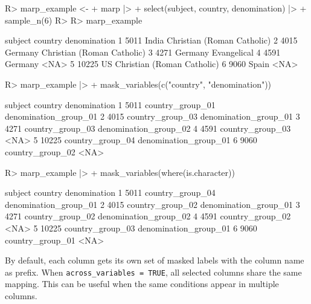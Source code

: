 \documentclass[
]{jss}
\begin{document}
\begin{CodeChunk}
\begin{CodeInput}
R> marp_example <-
+     marp |>
+     select(subject, country, denomination) |> 
+     sample_n(6)
R> 
R> marp_example
\end{CodeInput}
\begin{CodeOutput}
  subject country               denomination
1    5011   India Christian (Roman Catholic)
2    4015 Germany Christian (Roman Catholic)
3    4271 Germany                Evangelical
4    4591 Germany                       <NA>
5   10225      US Christian (Roman Catholic)
6    9060   Spain                       <NA>
\end{CodeOutput}
\begin{CodeInput}
R> marp_example |> 
+     mask_variables(c("country", "denomination"))
\end{CodeInput}
\begin{CodeOutput}
  subject          country          denomination
1    5011 country_group_01 denomination_group_01
2    4015 country_group_03 denomination_group_01
3    4271 country_group_03 denomination_group_02
4    4591 country_group_03                  <NA>
5   10225 country_group_04 denomination_group_01
6    9060 country_group_02                  <NA>
\end{CodeOutput}
\begin{CodeInput}
R> marp_example |> 
+     mask_variables(where(is.character))
\end{CodeInput}
\begin{CodeOutput}
  subject          country          denomination
1    5011 country_group_04 denomination_group_01
2    4015 country_group_02 denomination_group_01
3    4271 country_group_02 denomination_group_02
4    4591 country_group_02                  <NA>
5   10225 country_group_03 denomination_group_01
6    9060 country_group_01                  <NA>
\end{CodeOutput}
\end{CodeChunk}

By default, each column gets its own set of masked labels with the
column name as prefix. When \texttt{across\_variables\ =\ TRUE}, all
selected columns share the same mapping. This can be useful when the
same conditions appear in multiple columns.
\end{document}
